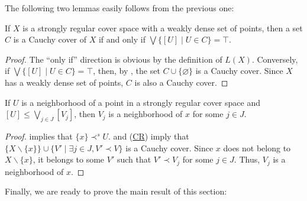 \documentclass[reqno]{amsart}
\newcommand{\axref}[1]{(\hyperref[ax:#1]{#1})}
\theoremstyle{definition}
\theoremstyle{remark}
\numberwithin{figure}{section}
\newcommand{\rb}{\prec}
\begin{document}
The following two lemmas easily follows from the previous one:
\begin{lem}
If $X$ is a strongly regular cover space with a weakly dense set of points, then a set $C$ is a Cauchy cover of $X$ if and only if $\bigvee \{ [U] \mid U \in C \} = \top$.
\end{lem}
\begin{proof}
The ``only if'' direction is obvious by the definition of $L(X)$.
Conversely, if $\bigvee \{ [U] \mid U \in C \} = \top$, then, by , the set $C \cup \{ \varnothing \}$ is a Cauchy cover.
Since $X$ has a weakly dense set of points, $C$ is also a Cauchy cover.
\end{proof}

\begin{lem}
If $U$ is a neighborhood of a point in a strongly regular cover space and $[U] \leq \bigvee_{j \in J} [V_j]$, then $V_j$ is a neighborhood of $x$ for some $j \in J$.
\end{lem}
\begin{proof}
 implies that $\{ x \} \rb^s U$.
 and \axref{CR} imply that $\{ X \backslash \{ x \} \} \cup \{ V' \mid \exists j \in J, V' \rb V \}$ is a Cauchy cover.
Since $x$ does not belong to $X \backslash \{ x \}$, it belongs to some $V'$ such that $V' \rb V_j$ for some $j \in J$.
Thus, $V_j$ is a neighborhood of $x$.
\end{proof}

Finally, we are ready to prove the main result of this section:
\end{document}
